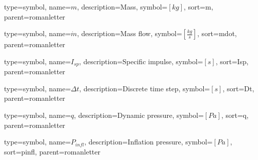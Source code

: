 {
type=symbol, %
name={\ensuremath{m}}, %
description={Mass}, %
symbol={$\left[kg\right]$}, %
sort=m, %
parent=romanletter %
}

{
type=symbol, %
name={\ensuremath{\dot{m}}}, %
description={Mass flow}, %
symbol={$\left[\frac{kg}{s}\right]$}, %
sort=mdot, %
parent=romanletter %
}

{
type=symbol, %
name={\ensuremath{I_{sp}}}, %
description={Specific impulse}, %
symbol={$\left[s\right]$}, %
sort=Isp, %
parent=romanletter %
}

{
type=symbol, %
name={\ensuremath{\Delta t}}, %
description={Discrete time step}, %
symbol={$\left[s\right]$}, %
sort=Dt, %
parent=romanletter %
}

{
type=symbol, %
name={\ensuremath{q}}, %
description={Dynamic pressure}, %
symbol={$\left[Pa\right]$}, %
sort=q, %
parent=romanletter %
}

{
type=symbol, %
name={\ensuremath{P_{infl}}}, %
description={Inflation pressure}, %
symbol={$\left[Pa\right]$}, %
sort=pinfl, %
parent=romanletter %
}

